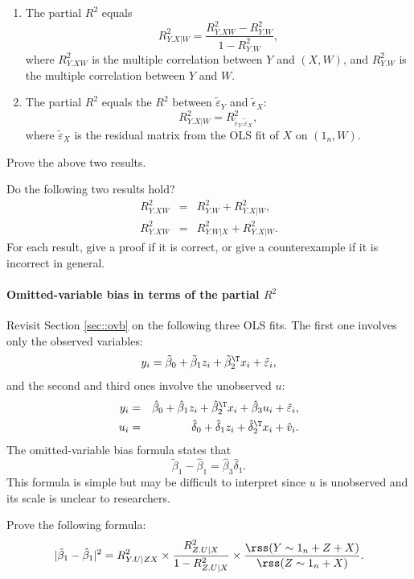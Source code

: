 \begin{enumerate}
\item
The partial $R^2$ equals 
$$
R^2_{Y.X|W} = \frac{  R^2_{Y.XW}  - R^2_{Y.W}  }{ 1- R^2_{Y.W}} , 
$$
where $R^2_{Y.XW} $ is the multiple correlation between $Y$ and $(X,W)$, and $R^2_{Y.W}$ is the multiple correlation between $Y$ and $W$.

\item
The partial $R^2$ equals the $R^2$ between $ \tilde{\varepsilon}_Y $ and $\tilde{\epsilon}_X$:
$$
R^2_{Y.X|W} =  R^2_{  \tilde{\varepsilon}_Y . \tilde{\varepsilon}_X }, 
$$
where $\tilde{\varepsilon}_X$ is the residual matrix from the OLS fit of $X$ on $(1_n, W)$. 
\end{enumerate}

Prove the above two results. 

Do the following two results hold? 
\begin{eqnarray*}
R^2_{Y.XW} &=& R^2_{Y.W} +  R^2_{Y.X|W} ,\\
R^2_{Y.XW} &=& R^2_{Y.W|X} +  R^2_{Y.X|W}.
\end{eqnarray*}
For each result, give a proof if it is correct, or give a counterexample if it is incorrect in general. 




\paragraph{Omitted-variable bias in terms of the partial $R^2$}\label{hw09::cochran-partial-R2}

Revisit Section \ref{sec::ovb} on the following three OLS fits. The first one involves only the observed variables:
$$
y_i  =  \tilde{\beta}_0 + \tilde{\beta}_1 z_i + \tilde{\beta}^{\T}_2 x_i + \tilde{\varepsilon}_i,
$$
and the second and third ones involve the unobserved $u$:
\begin{eqnarray*}
y_i &=& \hat{\beta}_0 + \hat{\beta}_1 z_i + \hat{\beta}^{\T}_2 x_i  + \hat{\beta}_3 u_i + \hat{\varepsilon}_i ,\\
u_i &=&  \hat{\delta}_0 +  \hat{\delta}_1 z_i  + \hat{\delta}_2^{\T} x_i + \hat{v}_i.
\end{eqnarray*}
The omitted-variable bias formula states that 
$$
\tilde{\beta}_1 - \hat{\beta}_1 =  \hat{\beta}_3 \hat{\delta}_1.
$$ 
This formula is simple but may be difficult to interpret since $u$ is unobserved and its scale is unclear to researchers. 

Prove the following formula: 
\begin{equation}\label{eq::ols-sensitivity-jrssb}
|\tilde{\beta}_1 - \hat{\beta}_1|^2 = R^2_{Y.U\mid ZX} \times \frac{R^2_{Z.U\mid X}}{1 - R^2_{Z.U\mid X}}  
\times   \frac{ \rss(Y\sim 1_n+Z+X)  }{  \rss(Z\sim 1_n+X) }  . 
\end{equation}
 

